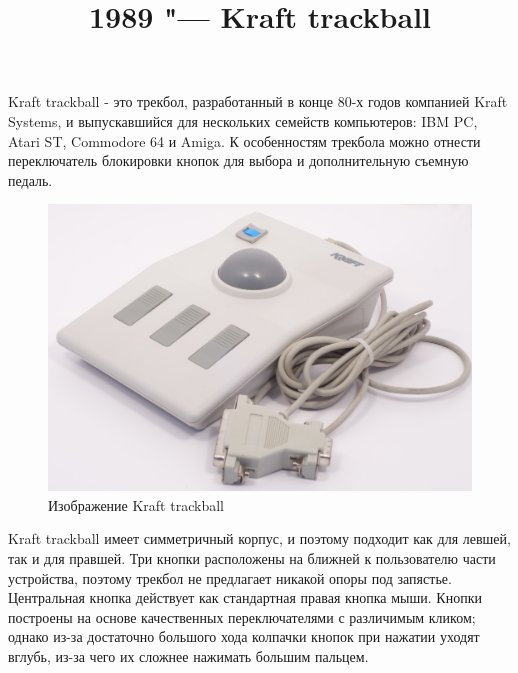 \documentclass[11pt, a4paper]{article}
\begin{document}
\title{1989 "--- Kraft trackball}
\date{}
\maketitle

Kraft trackball - это трекбол, разработанный в конце 80-х годов компанией Kraft Systems, и выпускавшийся для нескольких семейств компьютеров: IBM PC, Atari ST, Commodore 64 и Amiga. К особенностям трекбола можно отнести переключатель блокировки кнопок для выбора и дополнительную съемную педаль.

\begin{figure}[h]
    \centering
    \includegraphics[scale=0.4]{1989_kraft_trackball/page3.3.jpg}
    \caption{Изображение Kraft trackball}
    \label{fig:KraftPhoto}
\end{figure}

Kraft trackball имеет симметричный корпус, и поэтому подходит как для левшей, так и для правшей. Три кнопки расположены на ближней к пользователю части устройства, поэтому трекбол не предлагает никакой опоры под запястье. Центральная кнопка действует как стандартная правая кнопка мыши. Кнопки построены на основе качественных переключателями с различимым кликом; однако из-за достаточно большого хода колпачки кнопок при нажатии уходят вглубь, из-за чего их сложнее нажимать большим пальцем.
\end{document}
